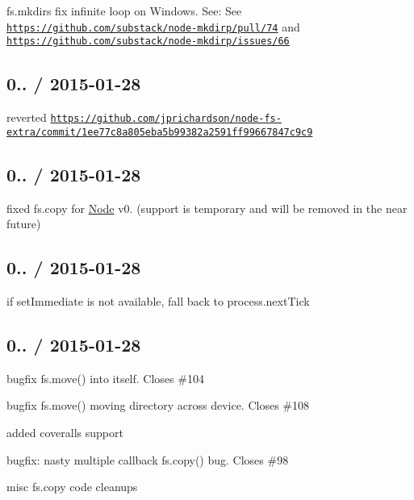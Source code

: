 \begin{DoxyItemize}
\item {\ttfamily fs.\+mkdirs} fix infinite loop on Windows. See\+: See \href{https://github.com/substack/node-mkdirp/pull/74}{\tt https\+://github.\+com/substack/node-\/mkdirp/pull/74} and \href{https://github.com/substack/node-mkdirp/issues/66}{\tt https\+://github.\+com/substack/node-\/mkdirp/issues/66}
\end{DoxyItemize}

\subsection*{0.. / 2015-\/01-\/28 }


\begin{DoxyItemize}
\item reverted \href{https://github.com/jprichardson/node-fs-extra/commit/1ee77c8a805eba5b99382a2591ff99667847c9c9}{\tt https\+://github.\+com/jprichardson/node-\/fs-\/extra/commit/1ee77c8a805eba5b99382a2591ff99667847c9c9}
\end{DoxyItemize}

\subsection*{0.. / 2015-\/01-\/28 }


\begin{DoxyItemize}
\item fixed {\ttfamily fs.\+copy} for \mbox{\hyperlink{classNode}{Node}} v0. (support is temporary and will be removed in the near future)
\end{DoxyItemize}

\subsection*{0.. / 2015-\/01-\/28 }


\begin{DoxyItemize}
\item if {\ttfamily set\+Immediate} is not available, fall back to {\ttfamily process.\+next\+Tick}
\end{DoxyItemize}

\subsection*{0.. / 2015-\/01-\/28 }


\begin{DoxyItemize}
\item bugfix {\ttfamily fs.\+move()} into itself. Closes \#104
\item bugfix {\ttfamily fs.\+move()} moving directory across device. Closes \#108
\item added coveralls support
\item bugfix\+: nasty multiple callback {\ttfamily fs.\+copy()} bug. Closes \#98
\item misc fs.\+copy code cleanups
\end{DoxyItemize}

